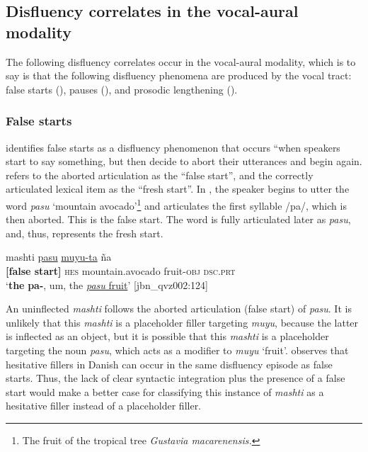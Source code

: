 \documentclass[output=paper]{langscibook}
\begin{document}
\subsection{Disfluency correlates in the vocal-aural modality} 
\label{sec:rice:4.1}
The following disfluency correlates occur in the vocal-aural modality, which is to say is that the following disfluency phenomena are produced by the vocal tract: false starts (), pauses (), and prosodic lengthening ().

\subsubsection{False starts}
\label{sec:rice:4.1.1}
\citet[710]{FoxTree1995} identifies false starts as a disfluency phenomenon that occurs “when speakers start to say something, but then decide to abort their utterances and begin again. \citet{FoxTree1995} refers to the aborted articulation as the “false start”, and the correctly articulated lexical item as the “fresh start”. In , the speaker begins to utter the word \textit{pasu} ‘mountain avocado’\footnote{The fruit of the tropical tree \textit{Gustavia macarenensis.}} and articulates the first syllable /pa/, which is then aborted. This is the false start. The word is fully articulated later as \textit{pasu}, and, thus, represents the fresh start.

\ea%
\label{ex:rice:22}
 {mashti} {\uline{pasu}} {\uline{muyu-ta}}  {ña}\\
{\textbf{[false start]}} {\textsc{hes}} {mountain.avocado} {fruit-\textsc{obj}} {\textsc{dsc.prt}}\\
\glt ‘\textbf{the} \textbf{pa-}, um, the \uline{\textit{pasu} fruit}’ [jbn\_qvz002:124]
\z

An uninflected \textit{mashti} follows the aborted articulation (false start) of \textit{pasu}. It is unlikely that this \textit{mashti} is a placeholder filler targeting \textit{muyu}, because the latter is inflected as an object, but it is possible that this \textit{mashti} is a placeholder targeting the noun \textit{pasu}, which acts as a modifier to \textit{muyu} ‘fruit’. \citet[59]{Navarretta2015} observes that hesitative fillers in Danish can occur in the same disfluency episode as false starts. Thus, the lack of clear syntactic integration plus the presence of a false start would make a better case for classifying this instance of \textit{mashti} as a hesitative filler instead of a placeholder filler.
\end{document}
